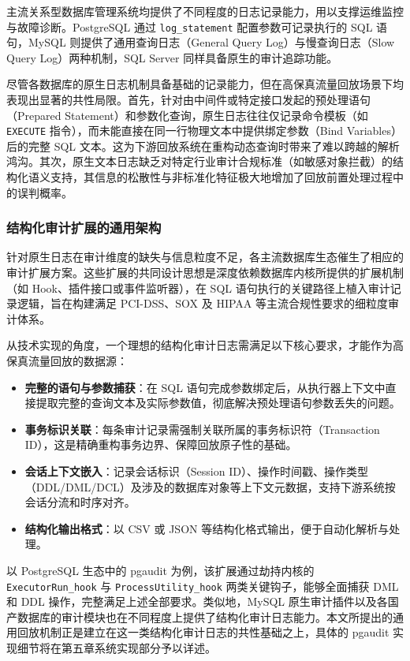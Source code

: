 主流关系型数据库管理系统均提供了不同程度的日志记录能力，用以支撑运维监控与故障诊断。PostgreSQL 通过 \texttt{log\_statement} 配置参数可记录执行的 SQL 语句\cite{PostgreSQLDoc}，MySQL 则提供了通用查询日志（General Query Log）与慢查询日志（Slow Query Log）两种机制\cite{MySQLAudit}，SQL Server 同样具备原生的审计追踪功能\cite{SQLServerAudit}。

尽管各数据库的原生日志机制具备基础的记录能力，但在高保真流量回放场景下均表现出显著的共性局限。首先，针对由中间件或特定接口发起的预处理语句（Prepared Statement）和参数化查询，原生日志往往仅记录命令模板（如 \texttt{EXECUTE} 指令），而未能直接在同一行物理文本中提供绑定参数（Bind Variables）后的完整 SQL 文本。这为下游回放系统在重构动态查询时带来了难以跨越的解析鸿沟。其次，原生文本日志缺乏对特定行业审计合规标准（如敏感对象拦截）的结构化语义支持，其信息的松散性与非标准化特征极大地增加了回放前置处理过程中的误判概率。

\subsubsection{结构化审计扩展的通用架构}

针对原生日志在审计维度的缺失与信息粒度不足，各主流数据库生态催生了相应的审计扩展方案。这些扩展的共同设计思想是深度依赖数据库内核所提供的扩展机制（如 Hook、插件接口或事件监听器），在 SQL 语句执行的关键路径上植入审计记录逻辑，旨在构建满足 PCI-DSS\cite{PCIDSS}、SOX\cite{SOX} 及 HIPAA\cite{HIPAA} 等主流合规性要求的细粒度审计体系。

从技术实现的角度，一个理想的结构化审计日志需满足以下核心要求，才能作为高保真流量回放的数据源：
\begin{itemize}
    \item \textbf{完整的语句与参数捕获}：在 SQL 语句完成参数绑定后，从执行器上下文中直接提取完整的查询文本及实际参数值，彻底解决预处理语句参数丢失的问题。
    \item \textbf{事务标识关联}：每条审计记录需强制关联所属的事务标识符（Transaction ID），这是精确重构事务边界、保障回放原子性的基础。
    \item \textbf{会话上下文嵌入}：记录会话标识（Session ID）、操作时间戳、操作类型（DDL/DML/DCL）及涉及的数据库对象等上下文元数据，支持下游系统按会话分流和时序对齐。
    \item \textbf{结构化输出格式}：以 CSV 或 JSON 等结构化格式输出，便于自动化解析与处理。
\end{itemize}

以 PostgreSQL 生态中的 pgaudit\cite{pgaudit} 为例，该扩展通过劫持内核的 \texttt{ExecutorRun\_hook} 与 \texttt{ProcessUtility\_hook} 两类关键钩子，能够全面捕获 DML 和 DDL 操作，完整满足上述全部要求。类似地，MySQL 原生审计插件\cite{MySQLAudit}以及各国产数据库的审计模块也在不同程度上提供了结构化审计日志能力。本文所提出的通用回放机制正是建立在这一类结构化审计日志的共性基础之上，具体的 pgaudit 实现细节将在第五章系统实现部分予以详述。

